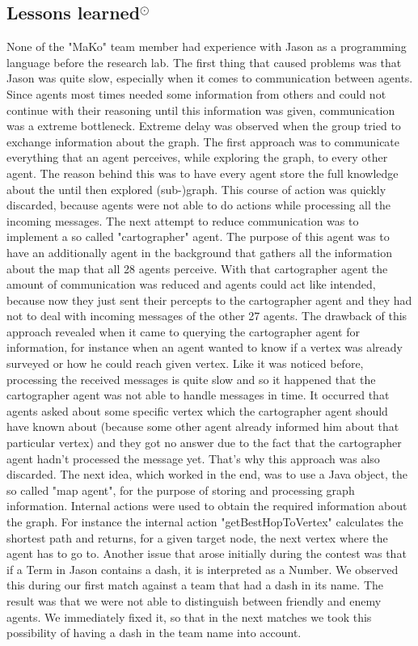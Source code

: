 \subsection{Lessons learned$^\odot$}
None of the "MaKo" team member had experience with Jason as a programming language before the research lab. The first thing that caused problems was that Jason was quite slow, especially when it comes to communication between agents. Since agents most times needed some information from others and could not continue with their reasoning until this information was given, communication was a extreme bottleneck. Extreme delay was observed when the group tried to exchange information about the graph. The first approach was to communicate everything that an agent perceives, while exploring the graph, to every other agent. The reason behind this was to have every agent store the full knowledge about the until then explored (sub-)graph. This course of action was quickly discarded, because agents were not able to do actions while processing all the incoming messages. The next attempt to reduce communication was to implement a so called "cartographer" agent. The purpose of this agent was to have an additionally agent in the background that gathers all the information about the map that all 28 agents perceive. With that cartographer agent the amount of communication was reduced and agents could act like intended, because now they just sent their percepts to the cartographer agent and they had not to deal with incoming messages of the other 27 agents. The drawback of this approach revealed when it came to querying the cartographer agent for information, for instance when an agent wanted to know if a vertex was already surveyed or how he could reach given vertex. Like it was noticed before, processing the received messages is quite slow and so it happened that the cartographer agent was not able to handle messages in time. It occurred that agents asked about some specific vertex which the cartographer agent should have known about (because some other agent already informed him about that particular vertex) and they got no answer due to the fact that the cartographer agent hadn't processed the message yet. That's why this approach was also discarded. The next idea, which worked in the end, was to use a Java object, the so called "map agent", for the purpose of storing and processing graph information. Internal actions were used to obtain the required information about the graph. For instance the internal action "getBestHopToVertex" calculates the shortest path and returns, for a given target node, the next vertex where the agent has to go to.
Another issue that arose initially during the contest was that if a Term in Jason contains a dash, it is interpreted as a Number. We observed this during our first match against a team that had a dash in its name. The result was that we were not able to distinguish between friendly and enemy agents. We immediately fixed it, so that in the next matches we took this possibility of having a dash in the team name into account.

